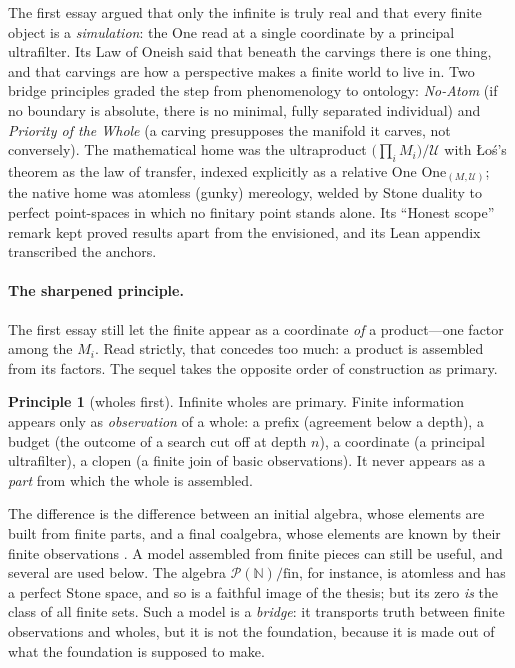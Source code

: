 \documentclass[]{article}
\theoremstyle{definition}
\newtheorem{principle}[theorem]{Principle}
\theoremstyle{remark}
\newcommand{\Uf}{\mathcal{U}}
\newcommand{\N}{\mathbb{N}}
\DeclareMathOperator{\uprod}{\textstyle\prod}
\newcommand{\Pfin}{\mathcal{P}(\N)/\mathrm{fin}}
\begin{document}
The first essay \cite{UI1} argued that only the infinite is truly real and that every finite
object is a \emph{simulation}: the One read at a single coordinate by a principal ultrafilter. Its
Law of Oneish said that beneath the carvings there is one thing, and that carvings are how a
perspective makes a finite world to live in. Two bridge principles graded the step from
phenomenology to ontology: \emph{No-Atom} (if no boundary is absolute, there is no minimal, fully
separated individual) and \emph{Priority of the Whole} (a carving presupposes the manifold it
carves, not conversely). The mathematical home was the ultraproduct $\bigl(\uprod_i M_i\bigr)/\Uf$
with {\L}o\'s's theorem as the law of transfer, indexed explicitly as a relative One
$\mathrm{One}_{(M,\Uf)}$; the native home was atomless (gunky) mereology, welded by Stone duality to
perfect point-spaces in which no finitary point stands alone. Its ``Honest scope'' remark kept proved
results apart from the envisioned, and its Lean appendix transcribed the anchors.

\paragraph{The sharpened principle.} The first essay still let the finite appear as a coordinate
\emph{of} a product---one factor among the $M_i$. Read strictly, that concedes too much: a product is
assembled from its factors. The sequel takes the opposite order of construction as primary.

\begin{principle}[wholes first]
\label{prin:wholes}
Infinite wholes are primary. Finite information appears only as \emph{observation} of a whole: a
prefix (agreement below a depth), a budget (the outcome of a search cut off at depth $n$), a
coordinate (a principal ultrafilter), a clopen (a finite join of basic observations). It never
appears as a \emph{part} from which the whole is assembled.
\end{principle}

The difference is the difference between an initial algebra, whose elements are built from finite
parts, and a final coalgebra, whose elements are known by their finite observations
\cite{Rutten2000}. A model assembled from finite pieces can still be useful, and several are used
below. The algebra $\Pfin$, for instance, is atomless and has a perfect Stone space, and so is a
faithful image of the thesis; but its zero \emph{is} the class of all finite sets. Such a model is a
\emph{bridge}: it transports truth between finite observations and wholes, but it is not the
foundation, because it is made out of what the foundation is supposed to make.
\end{document}
